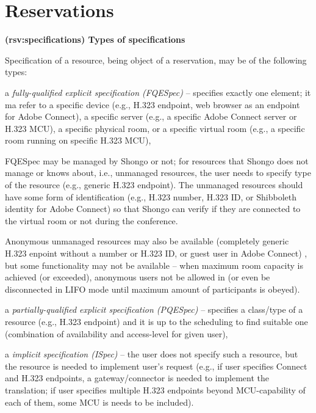 \documentclass[a4paper]{report}
\makeatletter
\newcounter{UCcounter}
\newenvironment{UseCases}%
	{\begin{list}{\textbf{UC-\arabic{UCcounter}}}{\@nmbrlisttrue\def\@listctr{UCcounter}}}%
	{\end{list}}
\newcommand{\UClabel}[1]{\label{UC:#1}}
\newcommand{\UseCase}[2]{\item\UClabel{#2} \textbf{(#2) #1}\\ \nopagebreak}
\makeatother
\begin{document}
\section{Reservations}

\begin{UseCases}

\UseCase{Types of specifications}{rsv:specifications}

Specification of a resource, being object of a reservation, may be of the
following types:

\begin{compactitem}

\item a \emph{fully-qualified explicit specification (FQESpec)} -- specifies
exactly one element; it ma refer to a specific device (e.g., H.323 endpoint,
web browser as an endpoint for Adobe Connect), a specific server (e.g., a
specific Adobe Connect server or H.323 MCU), a specific physical room, or a
specific virtual room (e.g., a specific room running on specific H.323 MCU),

FQESpec may be managed by Shongo or not; for resources that Shongo does not
manage or knows about, i.e., unmanaged resources, the user needs to specify
type of the resource (e.g., generic H.323 endpoint). The unmanaged resources
should have some form of identification (e.g., H.323 number, H.323 ID, or
Shibboleth identity for Adobe Connect) so that Shongo can verify if they are
connected to the virtual room or not during the conference.

Anonymous unmanaged resources may also be available (completely generic H.323
enpoint without a number or H.323 ID, or guest user in Adobe Connect) , but
some functionality may not be available -- when maximum room capacity is
achieved (or exceeded), anonymous users not be allowed in (or even be
disconnected in LIFO mode until maximum amount of participants is obeyed).


\item a \emph{partially-qualified explicit specification (PQESpec)} --
specifies a class/type of a resource (e.g., H.323 endpoint) and it is up to the
scheduling to find suitable one (combination of availability and access-level
for given user),

\item a \emph{implicit specification (ISpec)} -- the user does not specify such
a resource, but the resource is needed to implement user's request (e.g., if
user specifies Connect and H.323 endpoints, a gateway/connector is needed to
implement the translation; if user specifies multiple H.323 endpoints beyond
MCU-capability of each of them, some MCU is needs to be included).


\end{compactitem}
\end{UseCases}
\end{document}
